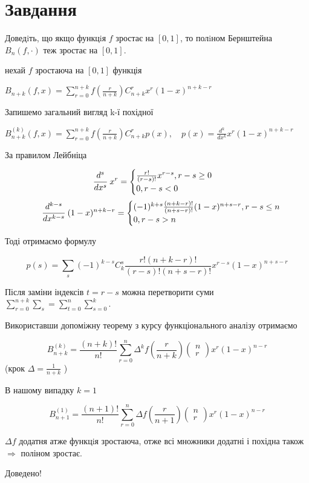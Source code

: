 
\chapter{Завдання \theHchapter}

\begin{tcolorbox}[title=Завдання]
    Доведiть, що якщо функцiя $f$ зростає на $[0, 1]$, то полiном 
    Бернштейна $B_n(f, \cdot)$ теж зростає на $[0, 1]$.
\end{tcolorbox}


нехай $f$ зростаюча на $[0, 1]$ функція 


$B_{n +k}(f, x) = \sum\limits_{r = 0}^{n+k}f(\frac{r}{n+k})
C_{n+k}^r x^r(1 - x)^{n+k-r}$


Запишемо загальний вигляд k-ї похідної


$B_{n +k}^{(k)}(f, x) = \sum\limits_{r = 0}^{n+k}
f(\frac{r}{n+k})C_{n+k}^r p(x),
\quad p(x) = \frac{d^k}{dx^k}x^r(1 - x)^{n + k -r}$


За правилом Лейбніца 


$$
\cfrac{d^s}{dx^s} \ x^r = 
\begin{cases}
    \frac{r!}{(r-s)!}x^{r-s}, r - s \geq 0 \\
    0, r-s < 0    
\end{cases}
$$ 
$$
\qquad
\cfrac{d^{k - s}}{dx^{k -s}} \ (1 - x)^{n+k-r} = 
\begin{cases}
    (-1)^{k + s}\frac{(n+k-r)!}{(n+s-r)!}(1 - x)^{n+s-r}, r - s \le n \\
    0, r-s > n    
\end{cases}
$$

\newpage
Тоді отримаємо формулу


$$
p(s) = \sum\limits_s (-1)^{k-s} C_k^s \frac{r!(n+k-r)!}{(r-s)!(n+s-r)!}
x^{r-s}(1-x)^{n+s-r}
$$


Після заміни індексів $t = r-s$ можна перетворити суми
$
\sum\limits_{r=0}^{n+k}\sum\limits_{s} = 
\sum\limits_{t=0}^{n}\sum\limits_{s=0}^{k}$.


Використавши допоміжну теорему з курсу функціонального аналізу отримаємо


$$
B_{n+k}^{(k)}=\frac{(n+k) !}{n !} \sum_{r=0}^n \Delta^k f\left(\frac{r}{n+k}\right)\left(\begin{array}{c}
n \\
r
\end{array}\right) x^r(1-x)^{n-r}
$$
(крок $\Delta = \frac{1}{n+k}$ )


В нашому випадку $k = 1$


$$ B_{n +1}^{(1)} = \frac{(n+1) !}{n !} \sum_{r=0}^n \Delta f
\left(\frac{r}{n+1}\right)
\left
(\begin{array}{c}n \\
r
\end{array}
\right) x^r(1-x)^{n-r} $$


$\Delta f$ додатня атже функцiя зростаюча, отже всі множники додатні і 
похідна також $\Rightarrow$ поліном зростає.


Доведено!